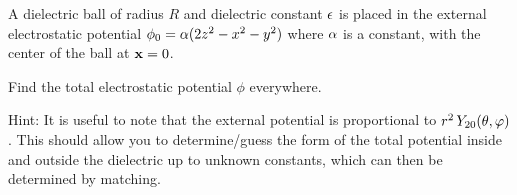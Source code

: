 \newcommand{\phio}{\phi_0}
\newcommand{\cE}{\mathcal{E}}
\newcommand{\cEint}{\cE_\text{int}}
\newcommand{\vP}{\vb{P}}
\newcommand{\evP}{\ev{\vP}}
\newcommand{\divP}{\div{\evP}}

\newcommand{\tfor}{\quad \text{for }}
\newcommand{\Ytotv}{Y_{2 0}\tv}

\begin{statement}{}
	A dielectric ball of radius $R$ and dielectric constant $\epsilon$ is placed in the external electrostatic potential $\phio = \alp (2z^2 - x^2 - y^2)$ where $\alpha$ is a constant, with the center of the ball at $\vb{x} = 0$.
\end{statement}

\begin{problem}
	Find the total electrostatic potential $\phi$ everywhere.
	
	Hint: It is useful to note that the external potential is proportional to $r^2 \, \Ytotv$.  This should allow you to determine/guess the form of the total potential inside and outside the dielectric up to unknown constants, which can then be determined by matching.
\end{problem}


